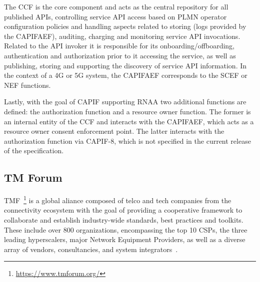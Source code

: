 
The \ac{CCF} is the core component and acts as the central repository for all published \acsp{API}, controlling service \acs{API} access based on \acs{PLMN} operator configuration policies and handling aspects related to storing (logs provided by the \ac{CAPIFAEF}), auditing, charging and monitoring service \acs{API} invocations. Related to the \acs{API} invoker it is responsible for its onboarding/offboarding, authentication and authorization prior to it accessing the service, as well as publishing, storing and supporting the discovery of service \acs{API} information. In the context of a \acs{4G} or \acs{5G} system, the \ac{CAPIFAEF} corresponds to the \ac{SCEF} or \ac{NEF} functions.

Lastly, with the goal of \acs{CAPIF} supporting \ac{RNAA} two additional functions are defined: the authorization function and a resource owner function. The former is an internal entity of the \ac{CCF} and interacts with the \ac{CAPIFAEF}, which acts as a resource owner consent enforcement point. The latter interacts with the authorization function via CAPIF-8, which is not specified in the current release of the specification.



\subsection{TM Forum}
\label{sota:telcoinitiatives:tmf}


\ac{TMF}~\footnote{\url{https://www.tmforum.org/}} is a global aliance composed of telco and tech companies from the connectivity ecosystem with the goal of providing a cooperative framework to collaborate and establish industry-wide standards, best practices and toolkits. These include over 800 organizations, encompassing the top 10 \acp{CSP}, the three leading hyperscalers, major Network Equipment Providers, as well as a diverse array of vendors, consultancies, and system integrators~\cite{aboutTMF}.

